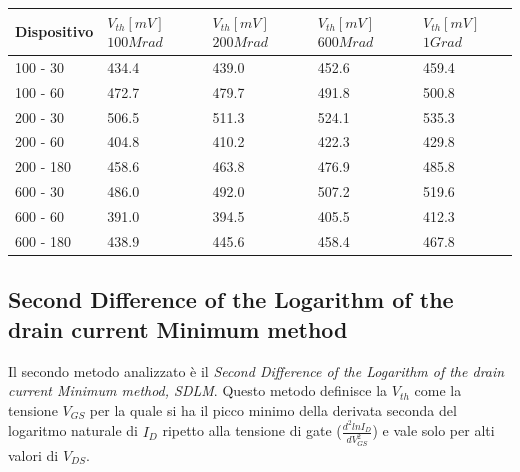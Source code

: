 \documentclass[12pt, letterpaper]{book}
\begin{document}
\begin{table}[htp]
\begin{center}
    \begin{tabular}{m{2.5 cm} m{2.5 cm} m{2.5 cm} m{2.5 cm} m{2.5 cm}}
      \toprule
      Dispositivo & $V_{th}[mV]$ $100Mrad$ & $V_{th}[mV]$ $200Mrad$ & $V_{th}[mV]$ $600Mrad$ & $V_{th}[mV]$ $1Grad$ \\
      \midrule
      100 - 30    & 434.4                  & 439.0                  & 452.6                  & 459.4                \\
      \hline
      100 - 60    & 472.7                  & 479.7                  & 491.8                  & 500.8                \\
      \hline
      200 - 30    & 506.5                  & 511.3                  & 524.1                  & 535.3                \\
      \hline
      200 - 60    & 404.8                  & 410.2                  & 422.3                  & 429.8                \\
      \hline
      200 - 180   & 458.6                  & 463.8                  & 476.9                  & 485.8                \\
      \hline
      600 - 30    & 486.0                  & 492.0                  & 507.2                  & 519.6                \\
      \hline
      600 - 60    & 391.0                  & 394.5                  & 405.5                  & 412.3                \\
      \hline
      600 - 180   & 438.9                  & 445.6                  & 458.4                  & 467.8                \\
      \bottomrule
    \end{tabular}
  \end{center}
\end{table}



\subsection{Second Difference of the Logarithm of the drain current Minimum method}

Il secondo metodo analizzato è il \emph{Second Difference of the Logarithm of the drain current Minimum method, SDLM}. Questo metodo definisce la $V_{th}$ come la tensione $V_{GS}$ per la quale si ha il picco minimo della derivata seconda del logaritmo naturale di $I_D$ ripetto alla tensione di gate ($\frac{d^2lnI_D}{dV_{GS}^2}$) e vale solo per alti valori di $V_{DS}$. \\
\end{document}
